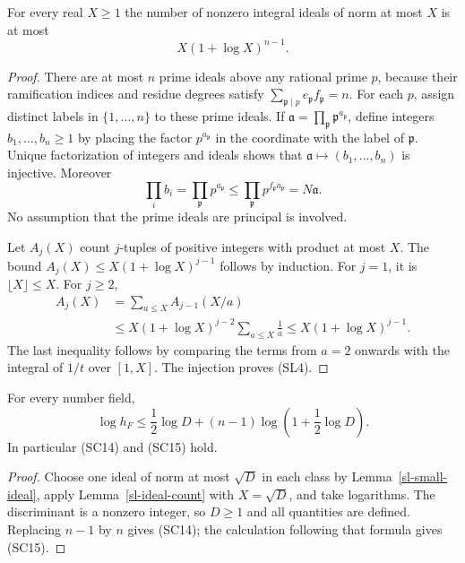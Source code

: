 \begin{lemma}\label{sl-ideal-count}
For every real $X\ge1$ the number of nonzero integral ideals
of norm at most $X$ is at most
\[
                    X(1+\log X)^{n-1}.
                    \tag{SL4}
\]
\end{lemma}
\begin{proof}
There are at most $n$ prime ideals above any rational prime $p$,
because their ramification indices and residue degrees satisfy
$\sum_{\mathfrak p\mid p}e_{\mathfrak p}f_{\mathfrak p}=n$.
For each $p$, assign distinct labels in $\{1,\ldots,n\}$ to
these prime ideals.  If
$\mathfrak a=\prod_{\mathfrak p}\mathfrak p^{a_{\mathfrak p}}$,
define integers $b_1,\ldots,b_n\ge1$ by placing the factor
$p^{a_{\mathfrak p}}$ in the coordinate with the label of
$\mathfrak p$.  Unique factorization of integers and ideals
shows that $\mathfrak a\mapsto(b_1,\ldots,b_n)$ is injective.
Moreover
\[
        \prod_i b_i
          =\prod_{\mathfrak p}p^{a_{\mathfrak p}}
          \le \prod_{\mathfrak p}
                         p^{f_{\mathfrak p}a_{\mathfrak p}}
          =N\mathfrak a.
\]
No assumption that the prime ideals are principal is involved.

Let $A_j(X)$ count $j$-tuples of positive integers with product
at most $X$.  The bound
$A_j(X)\le X(1+\log X)^{j-1}$ follows by induction.
For $j=1$, it is $\lfloor X\rfloor\le X$.  For $j\ge2$,
\[
 \begin{split}
 A_j(X)&=\sum_{a\le X}A_{j-1}(X/a)\\
       &\le X(1+\log X)^{j-2}\sum_{a\le X}\frac1a
        \le X(1+\log X)^{j-1}.
 \end{split}
\]
The last inequality follows by comparing the terms from $a=2$
onwards with the integral of $1/t$ over $[1,X]$.
The injection proves (SL4).
\end{proof}

\begin{corollary}\label{sl-class-number}
For every number field,
\[
       \log h_F\le\frac12\log D+
             (n-1)\log\left(1+\frac12\log D\right).
             \tag{SL5}
\]
In particular (SC14) and (SC15) hold.
\end{corollary}
\begin{proof}
Choose one ideal of norm at most $\sqrt D$ in each class by
Lemma~\ref{sl-small-ideal}, apply Lemma~\ref{sl-ideal-count}
with $X=\sqrt D$, and take logarithms.
The discriminant is a nonzero integer, so $D\ge1$ and all
quantities are defined.  Replacing $n-1$ by $n$ gives (SC14);
the calculation following that formula gives (SC15).
\end{proof}

